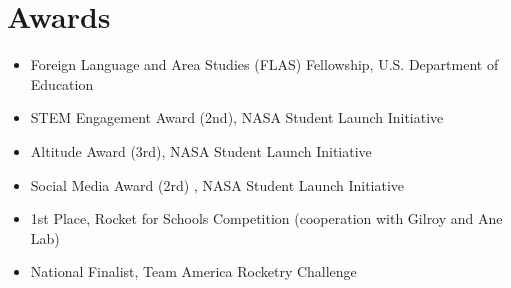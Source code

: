 \documentclass{mycv}
\begin{document}
\section{Awards}
\begin{itemize}
    \item{Foreign Language and Area Studies (FLAS) Fellowship, U.S. Department of Education }
    \item {STEM Engagement Award (2nd), NASA Student Launch Initiative }
    \item {Altitude Award (3rd), NASA Student Launch Initiative }
    \item {Social Media Award (2rd) , NASA Student Launch Initiative }
    \item {1st Place, Rocket for Schools Competition (cooperation with Gilroy and Ane Lab) }
    \item National Finalist, Team America Rocketry Challenge 
\end{itemize}
\thispagestyle{empty} 
\end{document}
